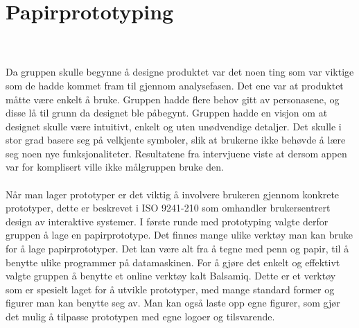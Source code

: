 \section{\textcolor[HTML]{D32F2F}{Papirprototyping}}
\\\\
Da gruppen skulle begynne å designe produktet var det noen ting som var viktige som de hadde kommet fram til gjennom analysefasen. Det ene var at produktet måtte være enkelt å bruke. Gruppen hadde flere behov gitt av personasene, og disse lå til grunn da designet ble påbegynt. Gruppen hadde en visjon om at designet skulle være intuitivt, enkelt og uten unødvendige detaljer. Det skulle i stor grad basere seg på velkjente symboler, slik at brukerne ikke behøvde å lære seg noen nye funksjonaliteter. Resultatene fra intervjuene viste at dersom appen var for komplisert ville ikke målgruppen bruke den.
\\\\
Når man lager prototyper er det viktig å involvere brukeren gjennom konkrete prototyper\cite{brukersentrert}, dette er beskrevet i ISO 9241-210 som omhandler brukersentrert design av interaktive systemer. I første runde med prototyping valgte derfor gruppen å lage en papirprototype. Det finnes mange ulike verktøy man kan bruke for å lage papirprototyper. Det kan være alt fra å tegne med penn og papir, til å benytte ulike programmer på datamaskinen. For å gjøre det enkelt og effektivt valgte gruppen å benytte et online verktøy kalt Balsamiq. Dette er et verktøy som er spesielt laget for å utvikle prototyper, med mange standard former og figurer man kan benytte seg av. Man kan også laste opp egne figurer, som gjør det mulig å tilpasse prototypen med egne logoer og tilsvarende.\\

